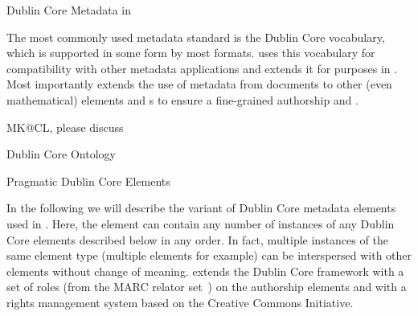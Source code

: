 
\begin{module}[id=dc-elements]
  \begin{omgroup}[id=dc-elements]{Dublin Core Metadata in \omdoc}

The most commonly used metadata standard is the Dublin Core vocabulary, which is
supported in some form by most formats. \omdoc uses this vocabulary for compatibility
with other metadata applications and extends it for {}
purposes in \omdoc.  Most importantly \omdoc extends the use of metadata from
documents to other (even mathematical) elements and {s} to
ensure a fine-grained authorship and {}.


\begin{newpart}{MK@CL, please discuss}
\begin{omgroup}{Dublin Core Ontology}

\end{omgroup}

\begin{omgroup}{Pragmatic Dublin Core Elements}

In the following we will describe the variant of Dublin Core metadata elements used in
\omdoc.  Here, the  element can contain any number of instances of
any Dublin Core elements described below in any order. In fact, multiple instances of the
same element type (multiple  elements for example) can be
interspersed with other elements without change of meaning.  \omdoc extends the Dublin
Core framework with a set of roles (from the MARC relator set~\cite{Marc:relators03}) on
the authorship elements and with a rights management system based on the Creative Commons
Initiative.



\end{omgroup}
\end{newpart}
\end{omgroup}
\end{module}
